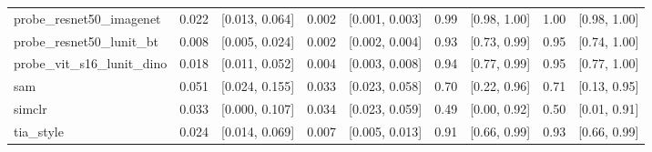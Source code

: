 \begin{tabular}{lrrrrrrrr}
probe\_resnet50\_imagenet & 0.022 & [0.013, 0.064] & 0.002 & [0.001, 0.003] & 0.99 & [0.98, 1.00] & 1.00 & [0.98, 1.00] \\
probe\_resnet50\_lunit\_bt & 0.008 & [0.005, 0.024] & 0.002 & [0.002, 0.004] & 0.93 & [0.73, 0.99] & 0.95 & [0.74, 1.00] \\
probe\_vit\_s16\_lunit\_dino & 0.018 & [0.011, 0.052] & 0.004 & [0.003, 0.008] & 0.94 & [0.77, 0.99] & 0.95 & [0.77, 1.00] \\
sam & 0.051 & [0.024, 0.155] & 0.033 & [0.023, 0.058] & 0.70 & [0.22, 0.96] & 0.71 & [0.13, 0.95] \\
simclr & 0.033 & [0.000, 0.107] & 0.034 & [0.023, 0.059] & 0.49 & [0.00, 0.92] & 0.50 & [0.01, 0.91] \\
tia\_style & 0.024 & [0.014, 0.069] & 0.007 & [0.005, 0.013] & 0.91 & [0.66, 0.99] & 0.93 & [0.66, 0.99] \\
\bottomrule
\end{tabular}
